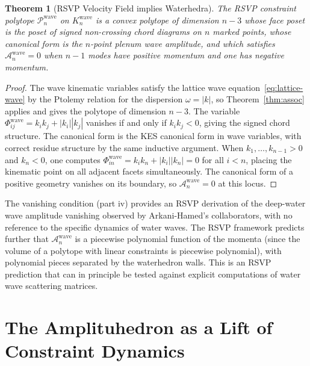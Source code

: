 \documentclass[12pt, oneside]{amsart}
\theoremstyle{plain}
\newtheorem{theorem}{Theorem}[section]
\theoremstyle{definition}
\theoremstyle{remark}
\newcommand{\Phif}{\Phi}
\newcommand{\Amp}{\mathcal{A}}
\begin{document}
\begin{theorem}[RSVP Velocity Field implies Waterhedra]
\label{thm:water}
The RSVP constraint polytope $\mathcal{P}_n^{\mathrm{wave}}$ on $K_n^{\mathrm{wave}}$ is a convex polytope of dimension $n-3$ whose face poset is the poset of signed non-crossing chord diagrams on $n$ marked points, whose canonical form is the $n$-point plenum wave amplitude, and which satisfies $\Amp_n^{\mathrm{wave}} = 0$ when $n-1$ modes have positive momentum and one has negative momentum.
\end{theorem}

\begin{proof}
The wave kinematic variables satisfy the lattice wave equation~\eqref{eq:lattice-wave} by the Ptolemy relation for the dispersion $\omega = |k|$, so Theorem~\ref{thm:assoc} applies and gives the polytope of dimension $n-3$. The variable $\Phif_{ij}^{\mathrm{wave}} = k_ik_j + |k_i||k_j|$ vanishes if and only if $k_ik_j < 0$, giving the signed chord structure. The canonical form is the KES canonical form in wave variables, with correct residue structure by the same inductive argument. When $k_1,\ldots,k_{n-1} > 0$ and $k_n < 0$, one computes $\Phif_{in}^{\mathrm{wave}} = k_i k_n + |k_i||k_n| = 0$ for all $i < n$, placing the kinematic point on all adjacent facets simultaneously. The canonical form of a positive geometry vanishes on its boundary, so $\Amp_n^{\mathrm{wave}} = 0$ at this locus.
\end{proof}

The vanishing condition (part iv) provides an RSVP derivation of the deep-water wave amplitude vanishing observed by Arkani-Hamed's collaborators, with no reference to the specific dynamics of water waves. The RSVP framework predicts further that $\Amp_n^{\mathrm{wave}}$ is a piecewise polynomial function of the momenta (since the volume of a polytope with linear constraints is piecewise polynomial), with polynomial pieces separated by the waterhedron walls. This is an RSVP prediction that can in principle be tested against explicit computations of water wave scattering matrices.

\section{The Amplituhedron as a Lift of Constraint Dynamics}
\label{sec:amplituhedron}
\end{document}
